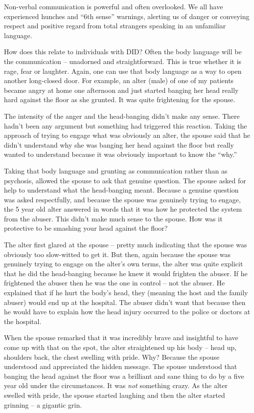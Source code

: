 \documentclass[]{book}
\begin{document}
Non-verbal communication is powerful and often overlooked. We all have experienced hunches and ``6th sense'' warnings, alerting us of danger or conveying respect and positive regard from total strangers speaking in an unfamiliar language.

How does this relate to individuals with DID? Often the body language will be the communication -- unadorned and straightforward. This is true whether it is rage, fear or laughter. Again, one can use that body language as a way to open another long-closed door. For example, an alter (male) of one of my patients became angry at home one afternoon and just started banging her head really hard against the floor as she grunted. It was quite frightening for the spouse.

The intensity of the anger and the head-banging didn't make any sense. There hadn't been any argument but something had triggered this reaction. Taking the approach of trying to engage what was obviously an alter, the spouse said that he didn't understand why she was banging her head against the floor but really wanted to understand because it was obviously important to know the ``why.''

Taking that body language and grunting as communication rather than as psychosis, allowed the spouse to ask that genuine question. The spouse asked for help to understand what the head-banging meant. Because a genuine question was asked respectfully, and because the spouse was genuinely trying to engage, the 5 year old alter answered in words that it was how he protected the system from the abuser. This didn't make much sense to the spouse. How was it protective to be smashing your head against the floor?

The alter first glared at the spouse -- pretty much indicating that the spouse was obviously too slow-witted to get it. But then, again because the spouse was genuinely trying to engage on the alter's own terms, the alter was quite explicit that he did the head-banging because he knew it would frighten the abuser. If he frightened the abuser then he was the one in control -- not the abuser. He explained that if he hurt the body's head, they (meaning the host and the family abuser) would end up at the hospital. The abuser didn't want that because then he would have to explain how the head injury occurred to the police or doctors at the hospital.

When the spouse remarked that it was incredibly brave and insightful to have come up with that on the spot, the alter straightened up his body -- head up, shoulders back, the chest swelling with pride. Why? Because the spouse understood and appreciated the hidden message. The spouse understood that banging the head against the floor was a brilliant and sane thing to do by a five year old under the circumstances. It was \emph{not} something crazy. As the alter swelled with pride, the spouse started laughing and then the alter started grinning -- a gigantic grin.
\end{document}
